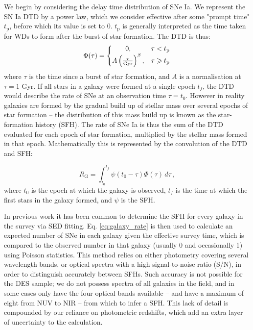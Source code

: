\documentclass[fleqn,usenatbib]{mnras}
\begin{document}
We begin by considering the delay time distribution of SNe Ia.
We represent the SN Ia DTD by a power law, which we consider effective after some "prompt time" $t_{\mathrm{p}}$, before which its value is set to 0. $t_{\mathrm{p}}$ is generally interpreted as the time taken for WDs to form after the burst of star formation. The DTD is thus:
\begin{equation}
 \Phi(\tau) = \left\{
    \begin{array}{@{}cc@{}}
    0 , & \tau < t_{\mathrm{p}} \\
    A\left(\frac{\tau}{\mathrm{Gyr}}\right)^{\beta} , & \tau \geq t_{\mathrm{p}}
    \end{array}\right.
        \label{eq:dtd}
\end{equation} 
where $\tau$ is the time since a burst of star formation, and $A$ is a normalisation at $\tau=1$ Gyr. If all stars in a galaxy were formed at a single epoch $t_f$, the DTD would describe the rate of SNe at an observation time $\tau = t_0$. However in reality galaxies are formed by the gradual build up of stellar mass over several epochs of star formation -- the distribution of this mass build up is known as the star-formation history (SFH). The rate of SNe Ia is thus the sum of the DTD evaluated for each epoch of star formation, multiplied by the stellar mass formed in that epoch. Mathematically this is represented by the convolution of the DTD and SFH:
 
\begin{equation}
    R_{\mathrm{G}} = \int_{t_0}^{t_f} \psi(t_0-\tau)\Phi(\tau)\,d\tau \,,
    \label{eq:galaxy_rate}
\end{equation}
where $t_0$ is the epoch at which the galaxy is observed, $t_f$ is the time at which the first stars in the galaxy formed, and $\psi$ is the SFH. 

In previous work \citep[e.g.][]{Strolger2004,Maoz2012} it has been common to determine the SFH for every galaxy in the survey via SED fitting. Eq. \ref{eq:galaxy_rate} is then used to calculate an expected number of SNe in each galaxy given the effective survey time, which is compared to the observed number in that galaxy (usually 0 and occasionally 1) using Poisson statistics. This method relies on either photometry covering several wavelength bands, or optical spectra with a high signal-to-noise ratio (S/N), in order to distinguish accurately between SFHs. Such accuracy is not possible for the DES sample; we do not possess spectra of all galaxies in the field, and in some cases only have the four optical bands available -- and have a maximum of eight from NUV to NIR -- from which to infer a SFH. This lack of detail is compounded by our reliance on photometric redshifts, which add an extra layer of uncertainty to the calculation. 
\end{document}
